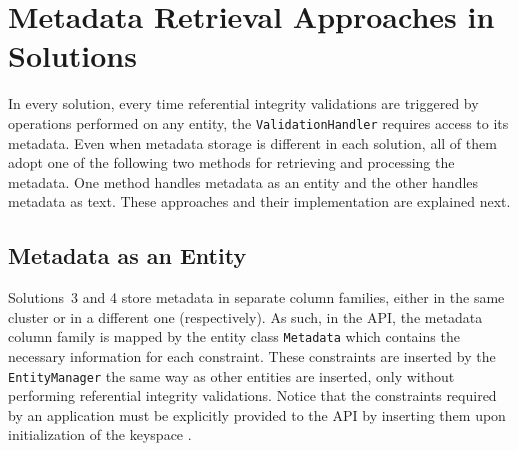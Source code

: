 \section{Metadata Retrieval Approaches in Solutions}
\label{s:implementation-MDinSolutions}

In every solution,  every time referential integrity validations are triggered
by operations  performed  on  any entity,  the
\texttt{ValidationHandler} requires access to its  metadata. Even when metadata
storage is different in each solution, all of them adopt  
 one of the following two methods for retrieving and processing the
metadata. One method handles metadata as an entity and the other handles
metadata as text. These approaches and their implementation 
are explained next.

\vfill

% 

 
\subsection{Metadata as an Entity} \label{ss:implementation-MDEntityClass}
Solutions~3 and 4 store  metadata in separate column families, either in the
same cluster or in a different one (respectively).  As such, in the \ac{API},
the metadata column family is mapped by the entity class \texttt{Metadata} which contains the
necessary information for each constraint.  These constraints are inserted 
by the \texttt{EntityManager} the same way as other entities are inserted, only
without performing referential integrity validations. Notice that the
constraints required by an application must be explicitly provided to the
\ac{API} by inserting them upon initialization of the keyspace .

